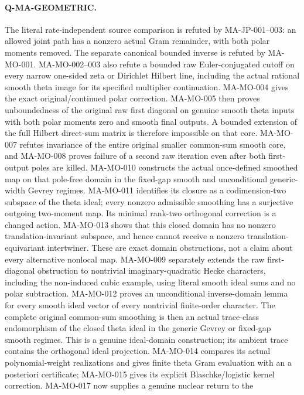 \documentclass[11pt,a4paper]{article}
\begin{document}
\paragraph{Q-MA-GEOMETRIC.}
The literal rate-independent source comparison is refuted by
MA-JP-001--003: an allowed joint path has a nonzero actual Gram
remainder, with both polar moments removed. The separate canonical
bounded inverse is refuted by MA-MO-001. MA-MO-002--003 also
refute a bounded raw Euler-conjugated cutoff on every narrow
one-sided zeta or Dirichlet Hilbert line, including the actual
rational smooth theta image for its specified multiplier
continuation. MA-MO-004 gives the exact original/continued polar correction.
MA-MO-005 then proves unboundedness of the original raw first
diagonal on genuine smooth theta inputs with both polar moments
zero and smooth final outputs. A bounded extension of the full
Hilbert direct-sum matrix is therefore impossible on that core.
MA-MO-007 refutes invariance of the entire original smaller
common-sum smooth core, and MA-MO-008 proves failure of a
second raw iteration even after both first-output poles are
killed. MA-MO-010 constructs the actual once-defined smoothed
map on that pole-free domain in the fixed-gap smooth and
unconditional generic-width Gevrey regimes. MA-MO-011 identifies
its closure as a codimension-two subspace of the theta ideal;
every nonzero admissible smoothing has a surjective outgoing
two-moment map. Its minimal rank-two orthogonal correction is
a changed action. MA-MO-013 shows that this closed domain has
no nonzero translation-invariant subspace, and hence cannot
receive a nonzero translation-equivariant intertwiner.
These are exact domain obstructions, not a claim about every
alternative nonlocal map. MA-MO-009 separately extends the
raw first-diagonal obstruction to nontrivial imaginary-quadratic
Hecke characters, including the non-induced cubic example,
using literal smooth ideal sums and no polar subtraction.
MA-MO-012 proves an unconditional inverse-domain lemma for
every smooth ideal vector of every nontrivial finite-order
character. The complete original common-sum smoothing is then
an actual trace-class endomorphism of the closed theta ideal
in the generic Gevrey or fixed-gap smooth regimes. This is
a genuine ideal-domain construction; its ambient trace contains
the orthogonal ideal projection. MA-MO-014 compares its actual
polynomial-weight realizations and gives finite theta Gram
evaluation with an a posteriori certificate; MA-MO-015 gives
its explicit Blaschke/logistic kernel correction.
MA-MO-017 now supplies a genuine nuclear return to the
\end{document}
